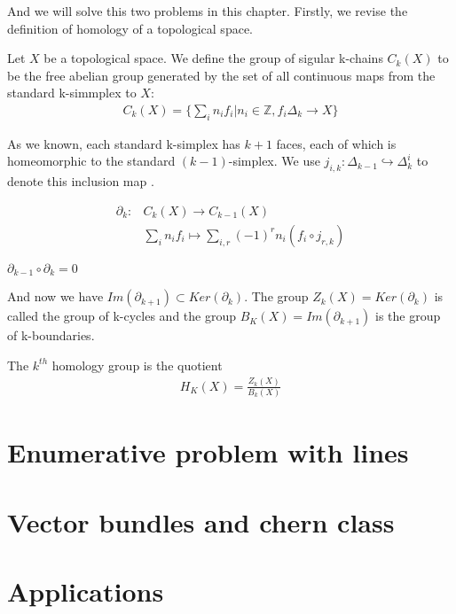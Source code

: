 \documentclass{article}
\begin{document}
And we will solve this two problems in this chapter.  Firstly, we revise the definition
of homology of a topological space.
\begin{df}
    Let $X$ be a topological space. We define the group of sigular k-chains $C_{k}(X)$
    to be the free abelian group generated by the set of all continuous maps from
    the standard k-simmplex to $X$:
    \begin{align*}
        C_{k}(X)=  \{\sum_{i}n_{i}f_{i}|n_{i} \in \mathbb{Z}, f_{i}\Delta_{k} \rightarrow X\}
    \end{align*}
\end{df}
As we known, each standard k-simplex has $k+1$ faces, each of which is homeomorphic to the standard
$(k-1)$-simplex. We use $j_{i,k}: \Delta_{k-1} \hookrightarrow \Delta_{k}^{i}$ to denote this inclusion map
.

\begin{df}
    \begin{align*}
         \partial_{k} : & C_{k}(X) \rightarrow C_{k-1}(X) \\
      & \sum_{i}n_{i}f_{i} \mapsto  \sum_{i,r}(-1)^{r}n_{i}(f_{i}\circ j_{r,k})
    \end{align*}
        
\end{df}

\begin{lm}
   
    $\partial_{k-1}\circ \partial_{k}=0$
    
    
\end{lm}

And now we have $Im(\partial_{k+1}) \subset Ker(\partial_{k})$. The group
$Z_{k}(X) = Ker(\partial_{k})$ is called the group of k-cycles and the group
$B_{K}(X) = Im(\partial_{k+1})$ is the group of k-boundaries.

\begin{df}
    The $k^{th}$ homology group is the quotient
    \begin{align*}
        H_{K}(X) = \frac{Z_{k}(X)}{B_{k}(X)}
    \end{align*}
\end{df}

\newpage
\section{Enumerative problem with lines}
\newpage
\section{Vector bundles and chern class}

\newpage
\section{Applications}
\end{document}
